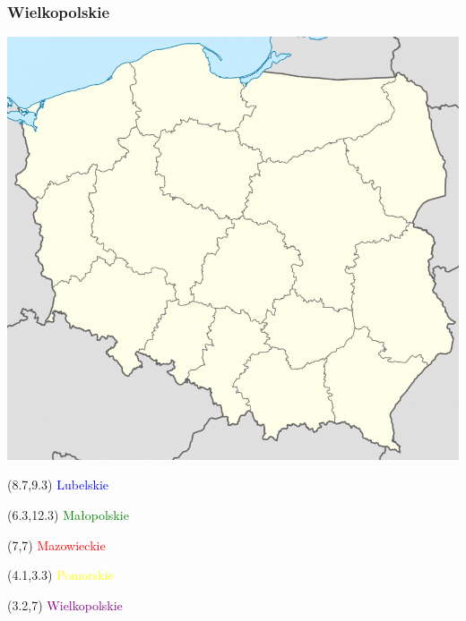 \documentclass{beamer}
\begin{document}
\begin{frame}
\frametitle{Wielkopolskie}
\includegraphics[scale=0.25]{Polska}
\begin{textblock}{3}(8.7,9.3)
\textcolor{blue}{Lubelskie}
\end{textblock}
\begin{textblock}{3}(6.3,12.3)
\textcolor{green}{Małopolskie}
\end{textblock}
\begin{textblock}{3}(7,7)
\textcolor{red}{Mazowieckie}
\end{textblock}
\begin{textblock}{3}(4.1,3.3)
\textcolor{yellow}{Pomorskie}
\end{textblock}
\begin{textblock}{3}(3.2,7)
\textcolor{purple}{Wielkopolskie}
\end{textblock}
\end{frame}
\end{document}
